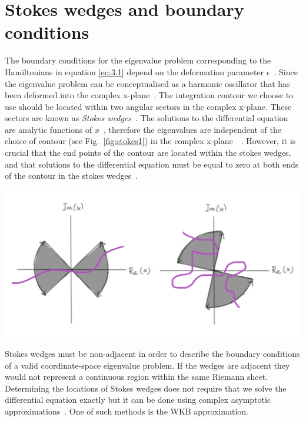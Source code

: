 \documentclass[12pt, a4paper]{report}
\newenvironment{Figure}
    {\par\medskip\noindent\minipage{\linewidth}}
    {\endminipage\par\medskip}
\begin{document}
\section{Stokes wedges and boundary conditions}\label{Stokes}
The boundary conditions for the eigenvalue problem corresponding to the Hamiltonians in equation \ref{eq:3.1} depend on the deformation parameter $\epsilon$~\cite{MakingSense}. Since the eigenvalue problem can be conceptualised as a harmonic oscillator that has been deformed into the complex x-plane~\cite{AnalyticContinuation}. The integration contour we choose to use should be located within two angular sectors in the complex x-plane. These sectors are known as \emph{Stokes wedges}~\cite{MakingSense}. 
The solutions to the differential equation are analytic functions of $x$~\cite{BenderOrszag}, therefore the eigenvalues are independent of the choice of contour (see Fig.~\ref{fig:stokes1}) in the complex x-plane~\cite{PTsymmetricQM}~\cite{Sorrell}. However, it is crucial that the end points of the contour are located within the stokes wedges, and that solutions to the differential equation must be equal to zero at both ends of the contour in the stokes wedges~\cite{Faria1}. 
\begin{Figure}
\centering
\includegraphics[width=.9\linewidth]{stokes1.pdf}
\label{fig:stokes1}
\end{Figure}
Stokes wedges must be non-adjacent in order to describe the boundary conditions of a valid coordinate-space eigenvalue problem. If the wedges are adjacent they would not represent a continuous region within the same Riemann sheet.
Determining the locations of Stokes wedges does not require that we solve the differential equation exactly but it can be done using complex asymptotic approximations~\cite{PTsymmetricQM}. One of such methods is the WKB approximation. 
\end{document}
